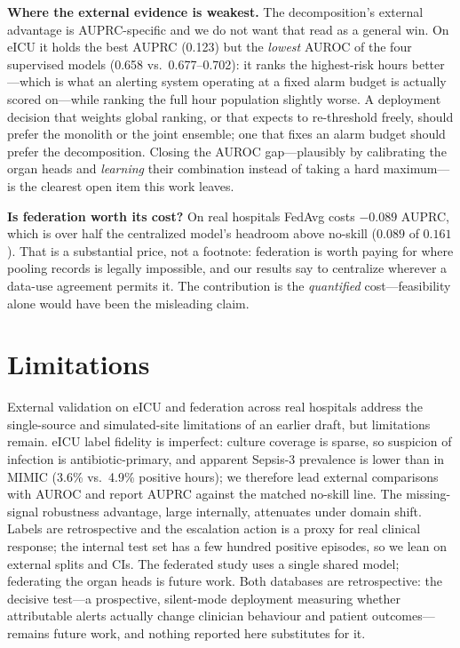 \documentclass[conference]{IEEEtran}
\begin{document}
\textbf{Where the external evidence is weakest.} The decomposition's external
advantage is AUPRC-specific and we do not want that read as a general win. On
eICU it holds the best AUPRC (0.123) but the \emph{lowest} AUROC of the four
supervised models (0.658 vs.\ 0.677--0.702): it ranks the highest-risk hours
better---which is what an alerting system operating at a fixed alarm budget is
actually scored on---while ranking the full hour population slightly worse. A
deployment decision that weights global ranking, or that expects to re-threshold
freely, should prefer the monolith or the joint ensemble; one that fixes an alarm
budget should prefer the decomposition. Closing the AUROC gap---plausibly by
calibrating the organ heads and \emph{learning} their combination instead of
taking a hard maximum---is the clearest open item this work leaves.

\textbf{Is federation worth its cost?} On real hospitals FedAvg costs $-0.089$
AUPRC, which is over half the centralized model's headroom above no-skill
($0.089$ of $0.161$). That is a substantial price, not a footnote: federation is
worth paying for where pooling records is legally impossible, and our results say
to centralize wherever a data-use agreement permits it. The contribution is the
\emph{quantified} cost---feasibility alone would have been the misleading claim.

\section{Limitations}
External validation on eICU and federation across real hospitals address the
single-source and simulated-site limitations of an earlier draft, but limitations
remain. eICU label fidelity is imperfect: culture coverage is sparse, so suspicion of
infection is antibiotic-primary, and apparent Sepsis-3 prevalence is lower than in
MIMIC (3.6\% vs.\ 4.9\% positive hours); we therefore lead external comparisons with
AUROC and report AUPRC against the matched no-skill line. The missing-signal
robustness advantage, large internally, attenuates under domain shift. Labels are
retrospective and the escalation action is a proxy for real clinical response; the
internal test set has a few hundred positive episodes, so we lean on external splits
and CIs. The federated study uses a single shared model; federating the organ heads is
future work. Both databases are retrospective: the decisive test---a prospective,
silent-mode deployment measuring whether attributable alerts actually change
clinician behaviour and patient outcomes---remains future work, and nothing
reported here substitutes for it.
\end{document}
